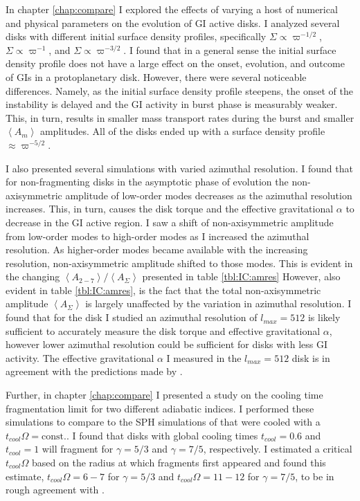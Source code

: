 In chapter \ref{chap:compare} I explored the effects of varying a host of numerical and physical parameters on the evolution of GI active disks. I analyzed several disks with different initial surface density profiles, specifically $\Sigma \propto \varpi^{-1/2}$, $\Sigma \propto \varpi^{-1}$, and $\Sigma \propto \varpi^{-3/2}$. I found that in a general sense the initial surface density profile does not have a large effect on the onset, evolution, and outcome of GIs in a protoplanetary disk. However, there were several noticeable differences. Namely, as the initial surface density profile steepens, the onset of the instability is delayed and the GI activity in burst phase is measurably weaker. This, in turn, results in smaller mass transport rates during the burst and smaller $\left<A_m \right>$ amplitudes. All of the disks ended up with a surface density profile $\approx \varpi^{-5/2}$.

I also presented several simulations with varied azimuthal resolution. I found that for non-fragmenting disks in the asymptotic phase of evolution the non-axisymmetric amplitude of low-order modes decreases as the azimuthal resolution increases. This, in turn, causes the disk torque and the effective gravitational $\alpha$ to decrease in the GI active region. I saw a shift of non-axisymmetric amplitude from low-order modes to high-order modes as I increased the azimuthal resolution. As higher-order modes became available with the increasing resolution, non-axisymmetric amplitude shifted to those modes. This is evident in the changing $\left<A_{2-7}\right>/\left<A_\Sigma\right>$ presented in table \ref{tbl:IC:amres}  However, also evident in table \ref{tbl:IC:amres}, is the fact that the total non-axisymmetric amplitude $\left<A_\Sigma\right>$ is largely unaffected by the variation in azimuthal resolution. I found that for the disk I studied an azimuthal resolution of $l_{max}=512$ is likely sufficient to accurately measure the disk torque and effective gravitational $\alpha$, however lower azimuthal resolution could be sufficient for disks with less GI activity. The effective gravitational $\alpha$ I measured in the $l_{max}=512$ disk is in agreement with the predictions made by \citet{gammie2001}.

Further, in chapter \ref{chap:compare} I presented a study on the cooling time fragmentation limit for two different adiabatic indices. I performed these simulations to compare to the SPH simulations of \citet{rice2005} that were cooled with a $t_{cool}\Omega = \mathrm{const.}$. I found that disks with global cooling times $t_{cool} = 0.6$ and $t_{cool} = 1$ will fragment for $\gamma = 5/3$ and $\gamma = 7/5$, respectively. I estimated a critical $t_{cool}\Omega$ based on the radius at which fragments first appeared and found this estimate, $t_{cool}\Omega = 6-7$ for $\gamma = 5/3$ and $t_{cool}\Omega = 11-12$ for $\gamma = 7/5$, to be in rough agreement with \citet{rice2005}.


